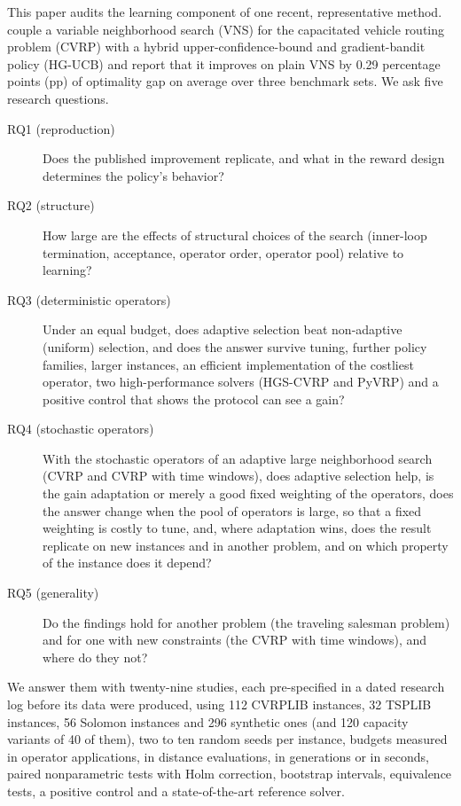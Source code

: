 This paper audits the learning component of one recent, representative method. \citet{kalatzantonakis2023} couple a variable neighborhood search (VNS) \citep{mladenovic1997,hansen2001} for the capacitated vehicle routing problem (CVRP) with a hybrid upper-confidence-bound and gradient-bandit policy (HG-UCB) and report that it improves on plain VNS by 0.29 percentage points (pp) of optimality gap on average over three benchmark sets. We ask five research questions.
\begin{description}
\item[RQ1 (reproduction)] Does the published improvement replicate, and what in the reward design determines the policy's behavior?
\item[RQ2 (structure)] How large are the effects of structural choices of the search (inner-loop termination, acceptance, operator order, operator pool) relative to learning?
\item[RQ3 (deterministic operators)] Under an equal budget, does adaptive selection beat non-adaptive (uniform) selection, and does the answer survive tuning, further policy families, larger instances, an efficient implementation of the costliest operator, two high-performance solvers (HGS-CVRP and PyVRP) and a positive control that shows the protocol can see a gain?
\item[RQ4 (stochastic operators)] With the stochastic operators of an adaptive large neighborhood search (CVRP and CVRP with time windows), does adaptive selection help, is the gain adaptation or merely a good fixed weighting of the operators, does the answer change when the pool of operators is large, so that a fixed weighting is costly to tune, and, where adaptation wins, does the result replicate on new instances and in another problem, and on which property of the instance does it depend?
\item[RQ5 (generality)] Do the findings hold for another problem (the traveling salesman problem) and for one with new constraints (the CVRP with time windows), and where do they not?
\end{description}

We answer them with twenty-nine studies, each pre-specified in a dated research log before its data were produced, using 112 CVRPLIB instances, 32 TSPLIB instances, 56 Solomon instances and 296 synthetic ones (and 120 capacity variants of 40 of them), two to ten random seeds per instance, budgets measured in operator applications, in distance evaluations, in generations or in seconds, paired nonparametric tests with Holm correction, bootstrap intervals, equivalence tests, a positive control and a state-of-the-art reference solver.

